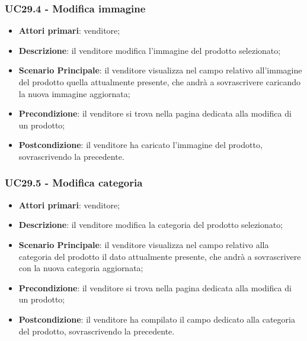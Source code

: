 \subsubsection{UC29.4 - Modifica immagine}
\begin{itemize}
\item \textbf{Attori primari}: venditore;
\item \textbf{Descrizione}: il venditore modifica l'immagine del prodotto selezionato;
\item \textbf{Scenario Principale}: il venditore visualizza nel campo relativo all'immagine del prodotto quella attualmente presente, che andrà a sovrascrivere caricando la nuova immagine aggiornata;
\item \textbf{Precondizione}: il venditore si trova nella pagina dedicata alla modifica di un prodotto;
\item \textbf{Postcondizione}: il venditore ha caricato l'immagine del prodotto, sovrascrivendo la precedente.
\end{itemize}

\subsubsection{UC29.5 - Modifica categoria}
\begin{itemize}
\item \textbf{Attori primari}: venditore;
\item \textbf{Descrizione}: il venditore modifica la categoria del prodotto selezionato;
\item \textbf{Scenario Principale}: il venditore visualizza nel campo relativo alla categoria del prodotto il dato attualmente presente, che andrà a sovrascrivere con la nuova categoria aggiornata;
\item \textbf{Precondizione}: il venditore si trova nella pagina dedicata alla modifica di un prodotto;
\item \textbf{Postcondizione}: il venditore ha compilato il campo dedicato alla categoria del prodotto, sovrascrivendo la precedente.
\end{itemize}

